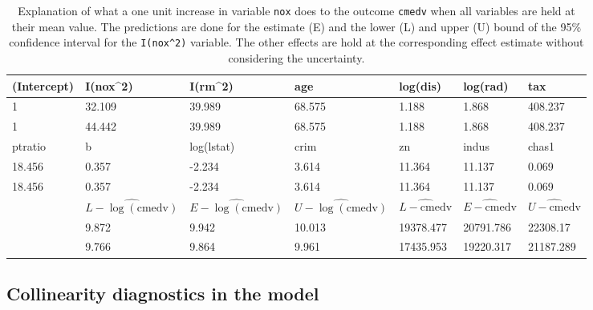 \documentclass[11pt,a4paper,twoside]{book}\usepackage[]{graphicx}\usepackage[]{xcolor}
\begin{document}
\begin{table}[H]\begin{center}
\caption{Explanation of what a one unit increase in variable \texttt{nox} does to the outcome \texttt{cmedv} when all variables are held at their mean value. The predictions are done for the estimate (E) and the lower (L) and upper (U) bound of the 95\% confidence interval for the \texttt{I(nox\textasciicircum 2)} variable. The other effects are hold at the corresponding effect estimate without considering the uncertainty. }\label{tab:pred_data}
\begingroup\footnotesize
\begin{tabular}{lllllll}
  \toprule
 (Intercept) & I(nox\textasciicircum 2) & I(rm\textasciicircum 2) & age & log(dis) & log(rad) & tax \\ 
   \midrule
1 & 32.109 & 39.989 & 68.575 & 1.188 & 1.868 & 408.237 \\ 
  1 & 44.442 & 39.989 & 68.575 & 1.188 & 1.868 & 408.237 \\ 
   \midrule
ptratio & b & log(lstat) & crim & zn & indus & chas1 \\ 
   \midrule
18.456 & 0.357 & -2.234 & 3.614 & 11.364 & 11.137 & 0.069 \\ 
  18.456 & 0.357 & -2.234 & 3.614 & 11.364 & 11.137 & 0.069 \\ 
   \midrule
 & $\hat{L-\log(\text{cmedv})}$ & $\hat{E-\log(\text{cmedv})}$ & $\hat{U-\log(\text{cmedv})}$ & $\hat{L-\text{cmedv}}$ & $\hat{E-\text{cmedv}}$ & $\hat{U-\text{cmedv}}$ \\ 
   \midrule
 & 9.872 & 9.942 & 10.013 & 19378.477 & 20791.786 & 22308.17 \\ 
   & 9.766 & 9.864 & 9.961 & 17435.953 & 19220.317 & 21187.289 \\ 
   \bottomrule
\end{tabular}
\endgroup

\end{center}\end{table}

\subsection{Collinearity diagnostics in the model}
\end{document}
